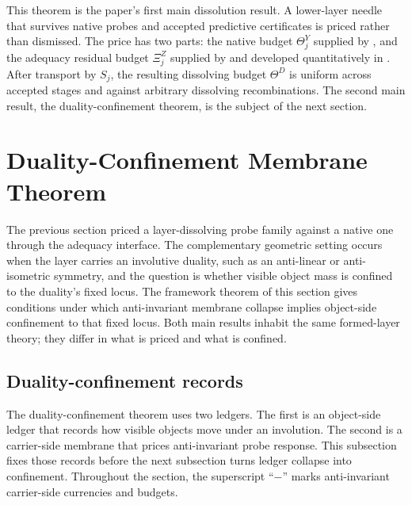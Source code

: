 \documentclass[11pt]{article}
\theoremstyle{definition}
\begin{document}
This theorem is the paper's first main dissolution result.  A
lower-layer needle that survives native probes and accepted predictive
certificates is priced rather than dismissed.  The price has two
parts: the native budget \(\Theta^Y_j\) supplied by
, and the adequacy residual budget
\(\Xi^Z_j\) supplied by  and developed
quantitatively in \citet{Tsiokos2026XiCompanion}.  After transport by
\(S_j\), the resulting dissolving budget \(\Theta^D\) is uniform across
accepted stages and against arbitrary dissolving recombinations.  The
second main result, the duality-confinement theorem, is the subject of
the next section.

 

\section{Duality-Confinement Membrane Theorem}
\label{sec:duality-confinement}

The previous section priced a layer-dissolving probe family against a
native one through the adequacy interface.  The complementary geometric
setting occurs when the layer carries an involutive duality, such as an
anti-linear or anti-isometric symmetry, and the question is whether
visible object mass is confined to the duality's fixed locus.  The
framework theorem of this section gives conditions under which
anti-invariant membrane collapse implies object-side confinement to
that fixed locus.  Both main results inhabit the same formed-layer theory; they differ
in what is priced and what is confined.

\subsection{Duality-confinement records}

The duality-confinement theorem uses two ledgers.  The first is an
object-side ledger that records how visible objects move under an
involution.  The second is a carrier-side membrane that prices
anti-invariant probe response.  This subsection fixes those records
before the next subsection turns ledger collapse into confinement.
Throughout the section, the superscript ``\(-\)'' marks anti-invariant
carrier-side currencies and budgets.
\end{document}
